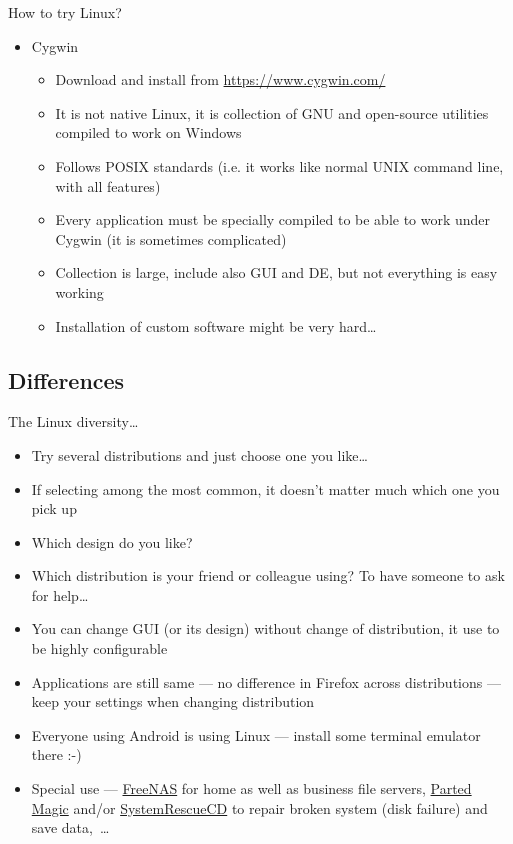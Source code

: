 \documentclass[compress, ucs, xelatex, 11pt, xcolor=svgnames, aspectratio=169,
	hyperref={
		bookmarks=true,
		unicode=true,
		colorlinks=true,
		pdftitle={Linux, command line and MetaCentrum},
		plainpages=false,
		pdfauthor={Vojtech Zeisek},
		pdfsubject={Course about use of Linux command line, writing shell scripts and using MetaCentrum of CESNET},
		pdfcreator={XeLaTeX},
		pdfkeywords={Linux, GNU, BASH, shell, command line, MetaCentrum},
		linkcolor=DarkRed, %
		anchorcolor=DarkBlue, %
		citecolor=Indigo, %
		filecolor=NavyBlue, %
		menucolor=DarkMagenta, %
		urlcolor=DarkBlue, %
		pdftex},
	url={hyphens, lowtilde} %
	]{beamer}
\begin{document}
\begin{frame}[allowframebreaks]{How to try Linux?}
\begin{itemize}
\begin{itemize}
		\end{itemize}
		\item Cygwin
		\begin{itemize}
			\item Download and install from \url{https://www.cygwin.com/}
			\item It is not native Linux, it is collection of GNU and open-source utilities compiled to work on Windows
			\item Follows POSIX standards (i.e. it works like normal UNIX command line, with all features)
			\item Every application must be specially compiled to be able to work under Cygwin (it is sometimes complicated)
			\item Collection is large, include also GUI and DE, but not everything is easy working
			\item Installation of custom software might be very hard\ldots
		\end{itemize}
	\end{itemize}
\end{frame}

\subsection{Differences}

\begin{frame}{The Linux diversity\ldots}
	\begin{itemize}
		\item Try several distributions and just choose one you like\ldots
		\item If selecting among the most common, it doesn't matter much which one you pick up
		\item Which design do you like?
		\item Which distribution is your friend or colleague using? To have someone to ask for help\ldots
		\item You can change GUI (or its design) without change of distribution, it use to be highly configurable
		\item Applications are still same --- no difference in Firefox across distributions --- keep your settings when changing distribution
		\item Everyone using Android is using Linux --- install some terminal emulator there :-)
		\item Special use --- \href{https://www.freenas.org/}{FreeNAS} for home as well as business file servers, \href{https://partedmagic.com/}{Parted Magic} and/or \href{https://www.system-rescue-cd.org/}{SystemRescueCD} to repair broken system (disk failure) and save data,~\ldots
	\end{itemize}
\end{frame}
\end{document}
